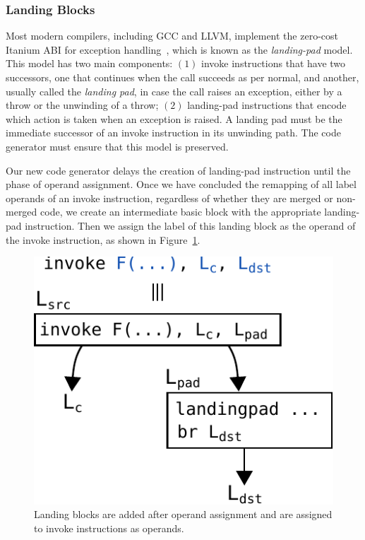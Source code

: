 \subsubsection{Landing Blocks}

Most modern compilers, including GCC and LLVM, implement the zero-cost Itanium ABI for exception handling~\cite{dinechin00}, which is known
as the \textit{landing-pad} model. This model has two main components: $(1)$ invoke instructions that have two successors, one that
continues when the call succeeds as per normal, and another, usually called the \textit{landing pad}, in case the call raises an exception,
either by a throw or the unwinding of a throw; $(2)$ landing-pad instructions that encode which action is taken when an exception is
raised. A landing pad must be the immediate successor of an invoke instruction in its unwinding path. The code generator must ensure that
this model is preserved.

Our new code generator delays the creation of landing-pad instruction until
the phase of operand assignment.
Once we have concluded the remapping of all label operands of an invoke instruction,
regardless of whether they are merged or non-merged code, we create an
intermediate basic block with the appropriate landing-pad instruction.
Then we assign the label of this landing block as the operand of
the invoke instruction, as shown in Figure~\ref{fig:landingpad}.

\begin{figure}[t!]
  \centering
  \includegraphics[scale=0.65]{src/merge-operation/figs/landingpad.pdf}
  \caption{Landing blocks are added after operand assignment and
	are assigned to invoke instructions as operands.}
  \label{fig:landingpad}
\end{figure}

